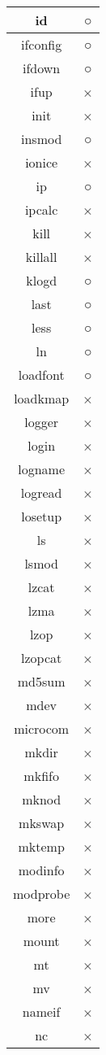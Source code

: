 \begin{longtable}{cc}
id & ○ \\ \hline
ifconfig & ○ \\ \hline
ifdown & ○ \\ \hline
ifup & × \\ \hline
init & × \\ \hline
insmod & ○ \\ \hline
ionice & × \\ \hline
ip & ○ \\ \hline
ipcalc & × \\ \hline
kill & × \\ \hline
killall & × \\ \hline
klogd & ○ \\ \hline
last & ○ \\ \hline
less & ○ \\ \hline
ln & ○ \\ \hline
loadfont & ○ \\ \hline
loadkmap & × \\ \hline
logger & × \\ \hline
login & × \\ \hline
logname & × \\ \hline
logread & × \\ \hline
losetup & × \\ \hline
ls & × \\ \hline
lsmod & × \\ \hline
lzcat & × \\ \hline
lzma & × \\ \hline
lzop & × \\ \hline
lzopcat & × \\ \hline
md5sum & × \\ \hline
mdev & × \\ \hline
microcom & × \\ \hline
mkdir & × \\ \hline
mkfifo & × \\ \hline
mknod & × \\ \hline
mkswap & × \\ \hline
mktemp & × \\ \hline
modinfo & × \\ \hline
modprobe & × \\ \hline
more & × \\ \hline
mount & × \\ \hline
mt & × \\ \hline
mv & × \\ \hline
nameif & × \\ \hline
nc & × \\ \hline

\end{longtable}
